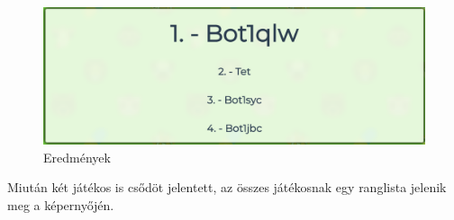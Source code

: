 
\begin{figure}[h!]
\centering
\includegraphics[scale=0.25]{images/ed4cc680904c8608d61522e3b3066dc1.png}
\caption{Eredmények}
\label{fig:ff}
\end{figure}

Miután két játékos is csődöt jelentett, az összes játékosnak egy ranglista jelenik meg  a képernyőjén.